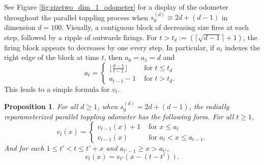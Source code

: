 \documentclass[12pt]{amsart}
\newtheorem{prop}{Proposition}[section]
\begin{document}
	See Figure \ref{fig:sizetwo_dim_1_odometer} for a display of the odometer throughout the parallel toppling process when $s^{(d)}_0 \equiv 2d + (d-1)$ in dimension $d=100$. Visually, a contiguous block of decreasing size fires at each step, followed by a ripple of outwards firings. For $t > t_d := (\lceil \sqrt{d-1} \rceil+1)$, the firing block appears to decreases by one every step. In particular, if $a_t$ indexes the right edge of the block at time $t$, then
	$a_0=a_1=d$ and
	\[
	a_t =
	\begin{cases}
	\lfloor \frac{ d - 1}{t-1} \rfloor & \mbox{ for $t \leq t_d$ } \\
	a_{t-1} - 1 &\mbox{ for $t > t_d $}.
	\end{cases}
	\]
	This leads to a simple formula for $v_t$. %
	
	\begin{prop} \label{prop:base_case}
		For all $d \geq 1$, when $s_0^{(d)} = 2 d + (d-1)$,  the radially reparameterized parallel toppling odometer has the following form. For all $t \geq 1$,
		\begin{equation} \label{eq:continuous_block}
		v_t(x) =
		\begin{cases}
		v_{t-1}(x) + 1  &\mbox{ for $x \leq a_{t}$} \\
		v_{t-1}(x)  &\mbox{ for $a_{t} < x \leq a_{t-1}$}.
		\end{cases} 
		\end{equation}
		And for each $1\leq t'<t\leq t'+x$ and $a_{t'-1}\geq x>a_{t'}$,
        \begin{equation}\label{eq:ripple}
        v_t(x)=v_{t'}(x-(t-t')).
		\end{equation}
		
		
		
	\end{prop}
	
\end{document}
